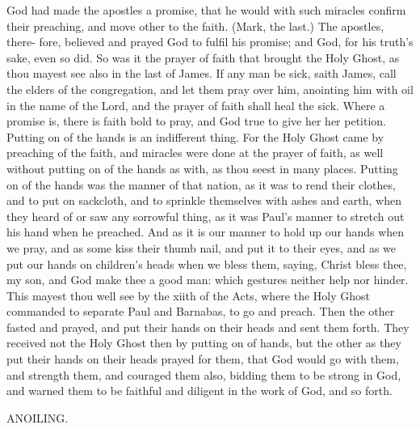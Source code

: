 \documentclass{custom}
\begin{document}
God had made the apostles a promise, that he would 
with such miracles confirm their preaching, and move 
other to the faith. (Mark, the last.) The apostles, there- 
fore, believed and prayed God to fulfil his promise; and 
God, for his truth's sake, even so did. So was it the 
prayer of faith that brought the Holy Ghost, as thou 
mayest see also in the last of James. If any man be sick, 
saith James, call the elders of the congregation, and let 
them pray over him, anointing him with oil in the name 
of the Lord, and the prayer of faith shall heal the sick. 
Where a promise is, there is faith bold to pray, and God 
true to give her her petition. Putting on of the hands is 
an indifferent thing. For the Holy Ghost came by 
preaching of the faith, and miracles were done at the 
prayer of faith, as well without putting on of the hands 
as with, as thou seest in many places. Putting on of the 
hands was the manner of that nation, as it was to rend 
their clothes, and to put on sackcloth, and to sprinkle 
themselves with ashes and earth, when they heard of or 
saw any sorrowful thing, as it was Paul's manner to 
stretch out his hand when he preached. And as it 
is our manner to hold up our hands when we pray, and 
as some kiss their thumb nail, and put it to their eyes, 
and as we put our hands on children's heads when we 
bless them, saying, Christ bless thee, my son, and God 
make thee a good man: which gestures neither help nor 
hinder. This mayest thou well see by the xiith of the 
Acts, where the Holy Ghost commanded to separate 
Paul and Barnabas, to go and preach. Then the other 
fasted and prayed, and put their hands on their heads and 
sent them forth. They received not the Holy Ghost 
then by putting on of hands, but the other as they put 
their hands on their heads prayed for them, that God 
would go with them, and strength them, and couraged 
them also, bidding them to be strong in God, and 
warned them to be faithful and diligent in the work of 
God, and so forth. 


ANOILING. 
\end{document}
